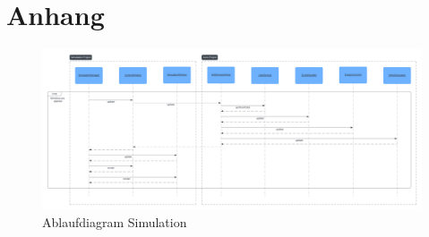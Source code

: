 \section{Anhang}

\begin{figure}
    \centering
    \includegraphics[width=1\linewidth]{graphics/simulation_sequence_diagram.png}
    \caption{Ablaufdiagram Simulation}
    \label{fig:simulation_sequence_diagram}
\end{figure}

\newpage
